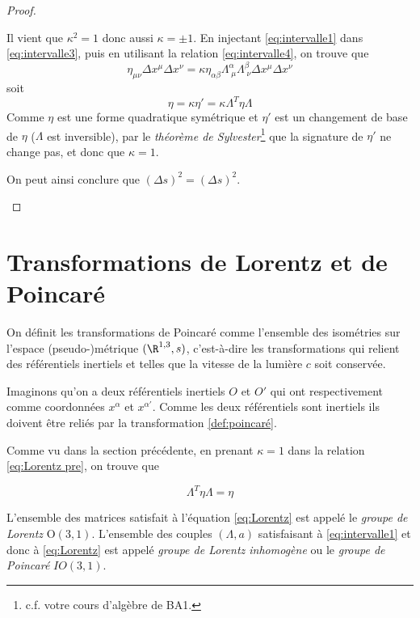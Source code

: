 \begin{proof}
\begin{enumerate}
Il vient que $\kappa ^2= 1$ donc aussi $\kappa = \pm 1$. En injectant \ref{eq:intervalle1} dans \ref{eq:intervalle3}, puis en utilisant la relation \ref{eq:intervalle4}, on trouve que
\begin{equation}
    \eta_{\mu\nu} \Delta x^\mu \Delta x^\nu = \kappa \eta_{\alpha\beta} \Lambda^\alpha_{\; \mu} \Lambda^\beta_{\; \nu}\Delta x^\mu \Delta x^\nu
\end{equation}
soit
\begin{equation}
    \label{eq:Lorentz pre}
    \eta = \kappa\eta'=\kappa \Lambda^T\eta \Lambda
\end{equation}
Comme $\eta$ est une forme quadratique symétrique et $\eta'$ est un changement de base de $\eta$ ($\Lambda$ est inversible), par le \textit{théorème de Sylvester}\footnote{c.f. votre cours d'algèbre de BA1.} que la signature de $\eta'$ ne change pas, et donc que $\kappa=1$.

On peut ainsi conclure que $(\Delta s)^2 = (\Delta s)^2$.
\end{enumerate}
\end{proof}

\section{Transformations de Lorentz et de Poincaré}

On définit les transformations de Poincaré comme l'ensemble des isométries sur l'espace (pseudo-)métrique $(\R^{1,3},s)$, c'est-à-dire les transformations qui relient des référentiels inertiels et telles que la vitesse de la lumière $c$ soit conservée.

Imaginons qu'on a deux référentiels inertiels $O$ et $O'$ qui ont respectivement comme coordonnées $x^{\alpha}$ et $x^{\alpha '}$. 
Comme les deux référentiels sont inertiels ils doivent être reliés par la transformation \ref{def:poincaré}. 

Comme vu dans la section précédente, en prenant $\kappa = 1$ dans la relation \ref{eq:Lorentz pre}, on trouve que

\begin{equation}
    \label{eq:Lorentz}
    \Lambda ^{T} \eta \Lambda = \eta
\end{equation}

L'ensemble des matrices satisfait à l'équation \ref{eq:Lorentz} est appelé le \textit{groupe de Lorentz} O$(3,1)$. L'ensemble des couples $(\Lambda,a)$ satisfaisant à \ref{eq:intervalle1} et donc à \ref{eq:Lorentz} est appelé \textit{groupe de Lorentz inhomogène} ou le \textit{groupe de Poincaré} $IO(3,1)$. 

